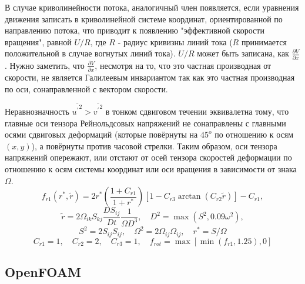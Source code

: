 		В случае криволинейности потока, аналогичный член появляется, если уравнения движения записать в криволинейной системе координат, ориентированной по направлению потока, что приводит к появлению "эффективной скорости вращения", равной $U/R$, где $R$ - радиус кривизны линий тока ($R$ принимается положительной в случае вогнутых линий тока). $U/R$ может быть записана, как $\frac{\partial V}{\partial x}$. Нужно заметить, что $\frac{\partial V}{\partial x}$, несмотря на то, что это частная производная от скорости, не является Галилеевым инвариантом так как это частная производная по оси, сонаправленной с вектором скорости.
		
		Неравнозначность $\overline{{u^{'}}^2} > \overline{{v^{'}}^2}$ в тонком сдвиговом течении эквивалетна тому, что главные оси тензора Рейнольдсовых напряжений не сонаправлены с главными осями сдвиговых деформаций (которые повёрнуты на $45^o$ по отношению к осям $(x, y)$), а повёрнуты против часовой стрелки. Таким образом, оси тензора напряжений опережают, или отстают от осей тензора скоростей деформации по отношению к осям системы координат или оси вращения в зависимости от знака $\Omega$.
		\begin{equation}
				f_{r1}(r^*,\tilde{r}) = 2r^*\left( \frac{1+C_{r1}}{1+ r^*} \right)\left[ 1-C_{r3}\arctan{(C_{r2}\tilde{r})} \right] - C_{r1},
		\end{equation}
		\begin{equation}
				\tilde{r} = 2\Omega_{ik}S_{kj}\frac{DS_{ij}}{Dt}\frac{1}{\Omega D^3}, \quad D^2 = \max(S^2, 0.09 \omega^2),
		\end{equation}
		$$
				S^2 = 2 S_{ij}S_{ij}, \quad \Omega^2 = 2 \Omega_{ij} \Omega_{ij}, \quad r^* = S/\Omega
		$$
		$$
				C_{r1} = 1, \quad C_{r2} = 2, \quad C_{r3} = 1, \quad f_{rot} = \max[\min(f_{r1},1.25),0]
		$$
	\newpage
	\subsection{OpenFOAM}

